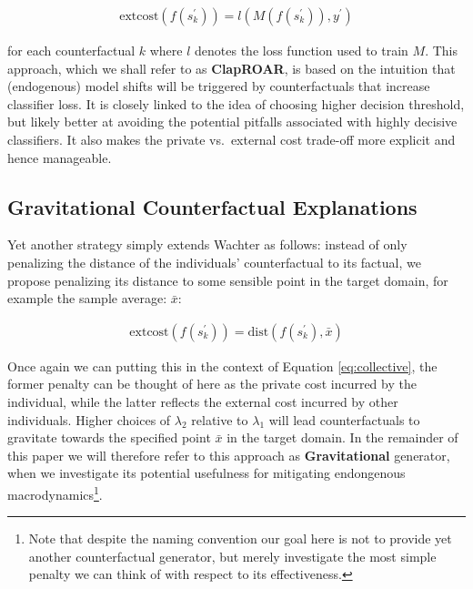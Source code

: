 \documentclass[conference,final,]{IEEEtran}
\theoremstyle{definition}
\theoremstyle{definition}
\theoremstyle{definition}
\theoremstyle{definition}
\theoremstyle{remark}
\begin{document}
\begin{equation}
\begin{aligned}
\text{extcost}(f(s_k^\prime)) = l(M(f(s_k^\prime)),y^\prime) \label{eq:clap}
\end{aligned}
\end{equation}

for each counterfactual \(k\) where \(l\) denotes the loss function used to train \(M\). This approach, which we shall refer to as \textbf{ClapROAR}, is based on the intuition that (endogenous) model shifts will be triggered by counterfactuals that increase classifier loss. It is closely linked to the idea of choosing higher decision threshold, but likely better at avoiding the potential pitfalls associated with highly decisive classifiers. It also makes the private vs.~external cost trade-off more explicit and hence manageable.

\hypertarget{gravitational-counterfactual-explanations}{%
\subsection{Gravitational Counterfactual Explanations}\label{gravitational-counterfactual-explanations}}

Yet another strategy simply extends Wachter as follows: instead of only penalizing the distance of the individuals' counterfactual to its factual, we propose penalizing its distance to some sensible point in the target domain, for example the sample average: \(\bar{x}\):

\begin{equation}
\begin{aligned}
\text{extcost}(f(s_k^\prime)) = \text{dist}(f(s_k^\prime),\bar{x})  \label{eq:grav}
\end{aligned}
\end{equation}

Once again we can putting this in the context of Equation \eqref{eq:collective}, the former penalty can be thought of here as the private cost incurred by the individual, while the latter reflects the external cost incurred by other individuals. Higher choices of \(\lambda_2\) relative to \(\lambda_1\) will lead counterfactuals to gravitate towards the specified point \(\bar{x}\) in the target domain. In the remainder of this paper we will therefore refer to this approach as \textbf{Gravitational} generator, when we investigate its potential usefulness for mitigating endongenous macrodynamics\footnote{Note that despite the naming convention our goal here is not to provide yet another counterfactual generator, but merely investigate the most simple penalty we can think of with respect to its effectiveness.}.
\end{document}
